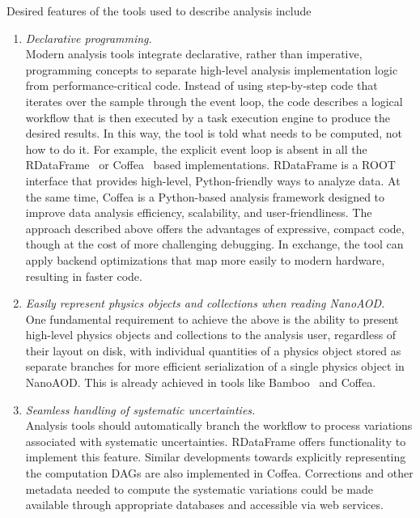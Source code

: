 Desired features of the tools used to describe analysis include
\begin{enumerate}
\item{} \label{item:nonimperative} {\em Declarative programming.}\\
Modern analysis tools integrate declarative, rather than imperative, programming concepts to separate high-level analysis implementation logic from performance-critical code. Instead of using step-by-step code that iterates over the sample through the event loop, the code describes a logical workflow that is then executed by a task execution engine to produce the desired results. In this way, the tool is told what needs to be computed, not how to do it.  For example, the explicit event loop is absent in all the RDataFrame~\cite{enrico_guiraud_2017_260230} or Coffea~\cite{coffea} based implementations. RDataFrame is a \textsc{ROOT} interface that provides high-level, Python-friendly ways to analyze data. At the same time, Coffea is a Python-based analysis framework designed to improve data analysis efficiency, scalability, and user-friendliness. The approach described above offers the advantages of expressive, compact code, though at the cost of more challenging debugging. In exchange, the tool can apply backend optimizations that map more easily to modern hardware, resulting in faster code.

\item{} \label{item:collections} {\em Easily represent physics objects and collections when reading NanoAOD.}\\
One fundamental requirement to achieve the above is the ability to present high-level physics objects and collections to the analysis user, regardless of their layout on disk, with individual quantities of a physics object stored as separate branches for more efficient serialization of a single physics object in NanoAOD. This is already achieved in tools like Bamboo~\cite{bamboo} and Coffea.

\item{} \label{item:systematics} {\em Seamless handling of systematic uncertainties.}\\ 
Analysis tools should automatically branch the workflow to process variations associated with systematic uncertainties. RDataFrame offers functionality to implement this feature. Similar developments towards explicitly representing the computation \glspl{DAG} are also implemented in Coffea. Corrections and other metadata needed to compute the systematic variations could be made available through appropriate databases and accessible via web services.


\end{enumerate}

